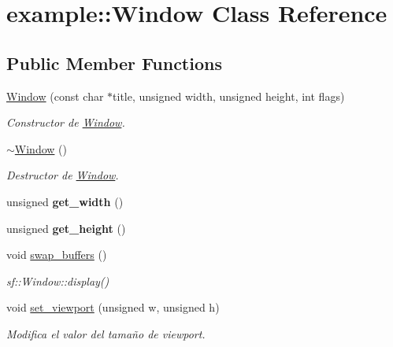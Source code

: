 \hypertarget{classexample_1_1_window}{}\section{example\+::Window Class Reference}
\label{classexample_1_1_window}
\subsection*{Public Member Functions}
\begin{DoxyCompactItemize}
\item 
\mbox{\hyperlink{classexample_1_1_window_a144eb8c2ca14e51d35ba18bc37f2eb56}{Window}} (const char $\ast$title, unsigned width, unsigned height, int flags)
\begin{DoxyCompactList}\small\item\em Constructor de \mbox{\hyperlink{classexample_1_1_window}{Window}}. \end{DoxyCompactList}\item 
\mbox{\hyperlink{classexample_1_1_window_a890353e04d12a85a3536004c01a1a0cd}{$\sim$\+Window}} ()
\begin{DoxyCompactList}\small\item\em Destructor de \mbox{\hyperlink{classexample_1_1_window}{Window}}. \end{DoxyCompactList}\item 
\mbox{\label{classexample_1_1_window_a9e121c70862294ea01409c640cf9065d}} 
unsigned {\bfseries get\+\_\+width} ()
\item 
\mbox{\label{classexample_1_1_window_a6ec5b72acf2f41814b950adcef13415c}} 
unsigned {\bfseries get\+\_\+height} ()
\item 
void \mbox{\hyperlink{classexample_1_1_window_a3f27b4a057e3d4219335cce4edc669fe}{swap\+\_\+buffers}} ()
\begin{DoxyCompactList}\small\item\em sf\+::\+Window\+::display() \end{DoxyCompactList}\item 
void \mbox{\hyperlink{classexample_1_1_window_a1b6b6b9cfb24fb32a0f2db4b7d7ba798}{set\+\_\+viewport}} (unsigned w, unsigned h)
\begin{DoxyCompactList}\small\item\em Modifica el valor del tamaño de viewport. \end{DoxyCompactList}\item 

\end{DoxyCompactItemize}
